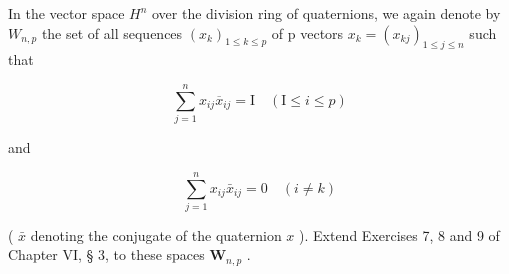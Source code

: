 In the vector space \(H^{n}\) over the division ring of quaternions, we again denote by \(W_{n,p}\) the set of all sequences \((x_{k})_{1\leqslant k\leqslant p}\) of p vectors \(x_{k}=(x_{kj})_{1\leqslant j\leqslant n}\) such that

\[
\sum_ {j = 1} ^ {n} x _ {i j} \overline {{{x}}} _ {i j} = \mathrm{I} \quad (\mathrm{I} \leqslant i \leqslant p)
\]

and

\[
\sum_ {j = 1} ^ {n} x _ {i j} \bar {x} _ {i j} = 0 \quad (i \neq k)
\]

( \(\bar{x}\) denoting the conjugate of the quaternion \(x\) ). Extend Exercises 7, 8 and 9 of Chapter VI, § 3, to these spaces \(\mathbf{W}_{n,p}\) .


